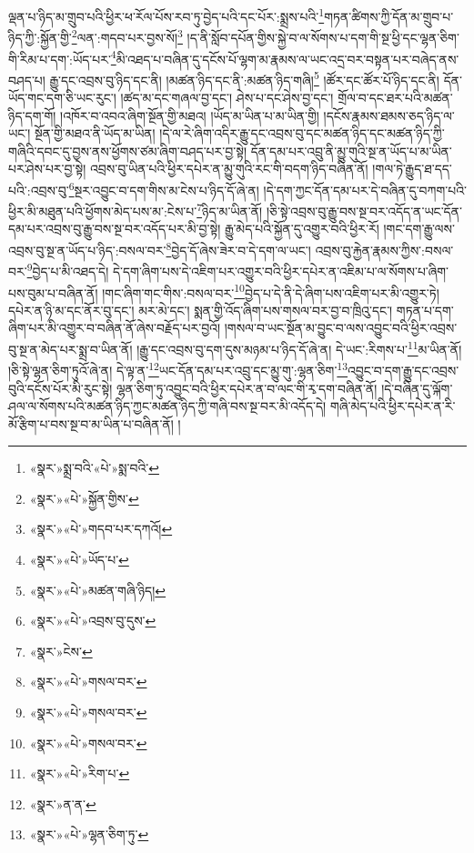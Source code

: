 ལྡན་པ་ཉིད་མ་གྲུབ་པའི་ཕྱིར་ཕ་རོལ་པོས་རབ་ཏུ་བྱེད་པའི་དང་པོར་:སྨྲས་པའི་\footnote{«སྣར་»སྨྲ་བའི་«པེ་»སྨ་བའི་}གཏན་ཚིགས་ཀྱི་དོན་མ་གྲུབ་པ་ཉིད་ཀྱི་:སྐྱོན་གྱི་\footnote{«སྣར་»«པེ་»སྐྱོན་གྱིས་}ལན་:གདབ་པར་བྱས་སོ།\footnote{«སྣར་»«པེ་»གདབ་པར་དཀའོ།} །ད་ནི་སློབ་དཔོན་གྱིས་སྐྱེ་བ་ལ་སོགས་པ་དག་གི་སྔ་ཕྱི་དང་ལྷན་ཅིག་གི་རིམ་པ་དག་:ཡོད་པར་\footnote{«སྣར་»«པེ་»ཡོད་པ་}མི་འཐད་པ་བཞིན་དུ་དངོས་པོ་ལྷག་མ་རྣམས་ལ་ཡང་འདྲ་བར་བསྟན་པར་བཞེད་ནས་བཤད་པ། རྒྱུ་དང་འབྲས་བུ་ཉིད་དང་ནི། །མཚན་ཉིད་དང་ནི་:མཚན་ཉིད་གཞི།\footnote{«སྣར་»«པེ་»མཚན་གཞི་ཉིད།} །ཚོར་དང་ཚོར་པོ་ཉིད་དང་ནི། དོན་ཡོད་གང་དག་ཅི་ཡང་རུང་། །ཚད་མ་དང་གཞལ་བྱ་དང་། ཤེས་པ་དང་ཤེས་བྱ་དང་། གྲོལ་བ་དང་ཐར་པའི་མཚན་ཉིད་དག་གོ། །འཁོར་བ་འབའ་ཞིག་སྔོན་གྱི་མཐའ། །ཡོད་མ་ཡིན་པ་མ་ཡིན་གྱི། །དངོས་རྣམས་ཐམས་ཅད་ཉིད་ལ་ཡང་། སྔོན་གྱི་མཐའ་ནི་ཡོད་མ་ཡིན། །དེ་ལ་རེ་ཞིག་འདིར་རྒྱུ་དང་འབྲས་བུ་དང་མཚན་ཉིད་དང་མཚན་ཉིད་ཀྱི་གཞིའི་དབང་དུ་བྱས་ནས་ཕྱོགས་ཙམ་ཞིག་བཤད་པར་བྱ་སྟེ། དོན་དམ་པར་འབྲུ་ནི་མྱུ་གུའི་སྔ་ན་ཡོད་པ་མ་ཡིན་པར་ཤེས་པར་བྱ་སྟེ། འབྲས་བུ་ཡིན་པའི་ཕྱིར་དཔེར་ན་མྱུ་གུའི་རང་གི་བདག་ཉིད་བཞིན་ནོ། །གལ་ཏེ་རྒྱུད་ཐ་དད་པའི་:འབྲས་བུ་\footnote{«སྣར་»«པེ་»འབྲས་བུ་དུས་}སྔར་འབྱུང་བ་དག་གིས་མ་ངེས་པ་ཉིད་དོ་ཞེ་ན། །དེ་དག་ཀྱང་དོན་དམ་པར་དེ་བཞིན་དུ་བཀག་པའི་ཕྱིར་མི་མཐུན་པའི་ཕྱོགས་མེད་པས་མ་:ངེས་པ་\footnote{«སྣར་»ངེས་}ཉིད་མ་ཡིན་ནོ། །ཅི་སྟེ་འབྲས་བུ་རྒྱུ་བས་སྔ་བར་འདོད་ན་ཡང་དོན་དམ་པར་འབྲས་བུ་རྒྱུ་བས་སྔ་བར་འདོད་པར་མི་བྱ་སྟེ། རྒྱུ་མེད་པའི་སྐྱོན་དུ་འགྱུར་བའི་ཕྱིར་རོ། །གང་དག་རྒྱུ་ལས་འབྲས་བུ་སྔ་ན་ཡོད་པ་ཉིད་:བསལ་བར་\footnote{«སྣར་»«པེ་»གསལ་བར་}བྱེད་དོ་ཞེས་ཟེར་བ་དེ་དག་ལ་ཡང་། འབྲས་བུ་རྐྱེན་རྣམས་ཀྱིས་:བསལ་བར་\footnote{«སྣར་»«པེ་»གསལ་བར་}བྱེད་པ་མི་འཐད་དེ། དེ་དག་ཞིག་པས་དེ་འཇིག་པར་འགྱུར་བའི་ཕྱིར་དཔེར་ན་འཇིམ་པ་ལ་སོགས་པ་ཞིག་པས་བུམ་པ་བཞིན་ནོ། །གང་ཞིག་གང་གིས་:བསལ་བར་\footnote{«སྣར་»«པེ་»གསལ་བར་}བྱེད་པ་དེ་ནི་དེ་ཞིག་པས་འཇིག་པར་མི་འགྱུར་ཏེ། དཔེར་ན་ཉི་མ་དང་ནོར་བུ་དང་། མར་མེ་དང་། སྨན་གྱི་འོད་ཞིག་པས་གསལ་བར་བྱ་བ་ཁྲིའུ་དང་། གཏན་པ་དག་ཞིག་པར་མི་འགྱུར་བ་བཞིན་ནོ་ཞེས་བརྗོད་པར་བྱའོ། །གསལ་བ་ཡང་སྔོན་མ་བྱུང་བ་ལས་འབྱུང་བའི་ཕྱིར་འབྲས་བུ་སྔ་ན་མེད་པར་སྨྲ་བ་ཡིན་ནོ། །རྒྱུ་དང་འབྲས་བུ་དག་དུས་མཉམ་པ་ཉིད་དོ་ཞེ་ན། དེ་ཡང་:རིགས་པ་\footnote{«སྣར་»«པེ་»རིག་པ་}མ་ཡིན་ནོ། །ཅི་སྟེ་ལྷན་ཅིག་ཏུའོ་ཞེ་ན། དེ་ལྟ་ན་\footnote{«སྣར་»ན་ན་}ཡང་དོན་དམ་པར་འབྲུ་དང་མྱུ་གུ་:ལྷན་ཅིག་\footnote{«སྣར་»«པེ་»ལྷན་ཅིག་ཏུ་}འབྱུང་བ་དག་རྒྱུ་དང་འབྲས་བུའི་དངོས་པོར་མི་རུང་སྟེ། ལྷན་ཅིག་ཏུ་འབྱུང་བའི་ཕྱིར་དཔེར་ན་བ་ལང་གི་རྭ་དག་བཞིན་ནོ། །དེ་བཞིན་དུ་ལྐོག་ཤལ་ལ་སོགས་པའི་མཚན་ཉིད་ཀྱང་མཚན་ཉིད་ཀྱི་གཞི་བས་སྔ་བར་མི་འདོད་དེ། གཞི་མེད་པའི་ཕྱིར་དཔེར་ན་རི་མོ་རྩིག་པ་བས་སྔ་བ་མ་ཡིན་པ་བཞིན་ནོ། །
